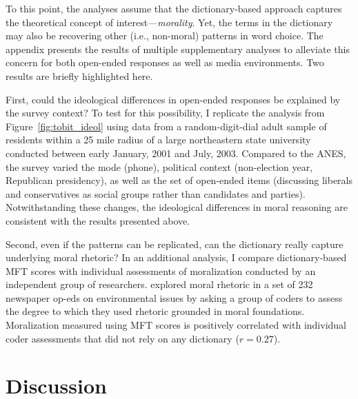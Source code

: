 \documentclass[12pt]{article}
\begin{document}
To this point, the analyses assume that the dictionary-based approach captures the theoretical concept of interest---\textit{morality}. Yet, the terms in the dictionary may also be recovering other (i.e., non-moral) patterns in word choice. The appendix presents the results of multiple supplementary analyses to alleviate this concern for both open-ended responses as well as media environments. Two results are briefly highlighted here.

First, could the ideological differences in open-ended responses be explained by the survey context? To test for this possibility, I replicate the analysis from Figure~\ref{fig:tobit_ideol} using data from a random-digit-dial adult sample of residents within a 25 mile radius of a large northeastern state university conducted between early January, 2001 and July, 2003. Compared to the ANES, the survey varied the mode (phone), political context (non-election year, Republican presidency), as well as the set of open-ended items (discussing liberals and conservatives as social groups rather than candidates and parties). Notwithstanding these changes, the ideological differences in moral reasoning are consistent with the results presented above.

Second, even if the patterns can be replicated, can the dictionary really capture underlying moral rhetoric? In an additional analysis, I compare dictionary-based MFT scores with individual assessments of moralization conducted by an independent group of researchers. \citet{feinberg2013moral} explored moral rhetoric in a set of 232 newspaper op-eds on environmental issues by asking a group of coders to assess the degree to which they used rhetoric grounded in moral foundations. Moralization measured using MFT scores is positively correlated with individual coder assessments that did not rely on any dictionary ($r=0.27$).


\section*{Discussion}

\end{document}
